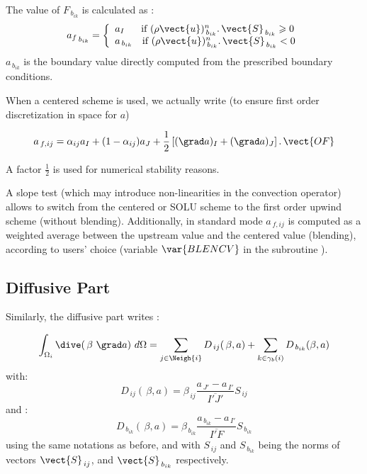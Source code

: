 The value of $F_{\,b_{ik}}$ is calculated as :
\begin{equation}\notag
{a_f}_{\,{b}_{ik}}=\left\lbrace\begin{array}{l}
a_I \text{ \ \ \ \ if }(\rho \vect{u})_{\,{b}_{ik}}^n
\text{.}\, \vect{S}_{\,{b}_{ik}}\geqslant 0\\
a_{\,{b}_{ik}}\text{ \ \ if } (\rho \vect{u})_{\,{b}_{ik}}^n
\text{.}\, \vect{S}_{\,{b}_{ik}} < 0
\end{array}\right.
\end{equation}
$a_{\,{b}_{ik}}$ is the boundary value directly computed from the prescribed boundary conditions.


When a centered scheme is used, we actually write (to ensure first order discretization in space for $a$) 

\begin{equation}\notag
a_{\,f,ij} = \alpha_{ij} a_I +  (1-\alpha_{ij}) a_J  + \displaystyle
\frac{1}{2}\left[(\grad a)_I+(\grad a)_J\right] \text{.}\, \vect{OF}
\end{equation}

A factor $\displaystyle \frac{1}{2}$ is used for numerical stability reasons.

A slope test (which may introduce non-linearities in the convection operator) allows to switch from 
the centered or SOLU scheme to the first order upwind scheme (without blending). Additionally, in standard mode $a_{\,f,ij}$ is computed as a weighted average between the upstream value and the centered value (blending), according to users' choice (variable $\var{BLENCV}$ in the subroutine  ).


\subsection*{\bf Diffusive Part}

Similarly, the diffusive part writes :

\begin{equation}\notag
\int_{\Omega_i}{\dive(\,\beta\ \grad a)\  d\Omega} =
\sum_{j\in \Neigh{i}}{D_{\,ij}(\,\beta, a)}
+\sum_{k\in {\gamma_b(i)}} {D_{\,{b}_{ik}}(\beta, a)}
\end{equation}
with:
\begin{equation}
D_{\,ij}(\,\beta, a) = \beta_{\,ij}
\frac{a_{\,J'}- a_{\,I'}}{\overline{I'J'}} S_{\,ij}
\end{equation}
and :
\begin{equation}
D_{\,b_{ik}}(\,\beta, a) = \beta_{\,b_{ik}}
\frac{a_{\,b_{ik}}-a_{\,I'}}{\overline{I'F}} S_{\,b_{ik}}
\end{equation}
using the same notations as before, and with $S_{\,ij}$ and $S_{\,b_{ik}}$ being the norms of  vectors 
$\vect{S}_{\,ij}$, and $\vect{S}_{\,b_{ik}}$ respectively.


